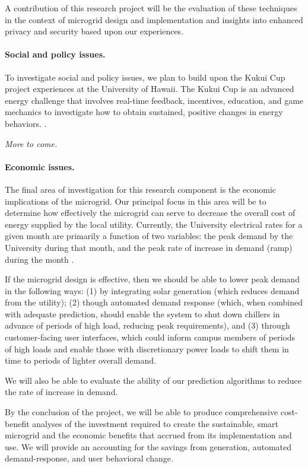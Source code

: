 A contribution of this research project will be the evaluation of these
techniques in the context of microgrid design and implementation and
insights into enhanced privacy and security based upon our experiences.

\paragraph{Social and policy issues.}

To investigate social and policy issues, we plan to build upon the Kukui
Cup project experiences at the University of Hawaii. The Kukui Cup is an
advanced energy challenge that involves real-time feedback, incentives,
education, and game mechanics to investigate how to obtain sustained,
positive changes in energy behaviors. \cite{csdl2-11-03,csdl2-11-02}.

{\em More to come.}

\paragraph{Economic issues.}

The final area of investigation for this research component is the economic
implications of the microgrid.  Our principal focus in this area will be to
determine how effectively the microgrid can serve to decrease the overall
cost of energy supplied by the local utility.  Currently, the University
electrical rates for a given month are primarily a function of two
variables: the peak demand by the University during that month, and the
peak rate of increase in demand (ramp) during the month \cite{Hafner2011}.

If the microgrid design is effective, then we should be able to lower peak
demand in the following ways: (1) by integrating solar generation (which reduces demand
from the utility); (2) though automated demand response (which, when
combined with adequate prediction, should enable the system to shut down
chillers in advance of periods of high load, reducing peak requirements),
and (3) through customer-facing user interfaces, which could inform campus
members of periods of high loads and enable those with discretionary power
loads to shift them in time to periods of lighter overall demand. 

We will also be able to evaluate the ability of our prediction algorithms
to reduce the rate of increase in demand. 

By the conclusion of the project, we will be able to produce comprehensive
cost-benefit analyses of the investment required to create the sustainable,
smart microgrid and the economic benefits that accrued from its
implementation and use.  We will provide an accounting for the savings from
generation, automated demand-response, and user behavioral change.




  


